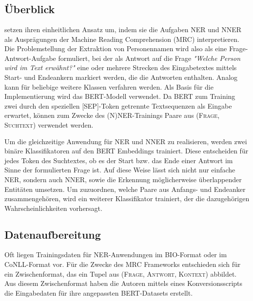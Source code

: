 

\chapter{}
\label{ch:MRC}


\section{Überblick}
\label{ch:MRC:sec:Überblick}

\cite{li2019unified} setzen ihren einheitlichen Ansatz um, indem sie die Aufgaben NER und NNER als Ausprägungen der Machine Reading Comprehension (MRC) interpretieren. Die Problemstellung der Extraktion von Personennamen wird also als eine Frage-Antwort-Aufgabe formuliert, bei der als Antwort auf die Frage \emph{"Welche Person wird im Text erwähnt?"} eine oder mehrere Strecken des Eingabetextes mittels Start- und Endeankern markiert werden, die die Antworten enthalten. Analog kann für beliebige weitere Klassen verfahren werden. Als Basis für die Implementierung wird das BERT-Modell \parencite{devlin2019bert} verwendet. Da BERT zum Training zwei durch den speziellen [SEP]-Token getrennte Textsequenzen als Eingabe erwartet, können zum Zwecke des (N)NER-Trainings Paare aus \textsc{(Frage, Suchtext)} verwendet werden.

Um die gleichzeitige Anwendung für NER und NNER zu realisieren, werden zwei binäre Klassifikatoren auf den BERT Embeddings trainiert. Diese entscheiden für jedes Token des Suchtextes, ob es der Start bzw. das Ende einer Antwort im Sinne der formulierten Frage ist. Auf diese Weise lässt sich nicht nur einfache NER, sondern auch NNER, sowie die Erkennung möglicherweise überlappender Entitäten umsetzen. Um zuzuordnen, welche Paare aus Anfangs- und Endeanker zusammengehören, wird ein weiterer Klassifikator trainiert, der die dazugehörigen Wahrscheinlichkeiten vorhersagt.

\section{Datenaufbereitung}
\label{ch:MRC:sec:Datenaufbereitung}

Oft liegen Trainingsdaten für NER-Anwendungen im BIO-Format oder im CoNLL-Format vor. Für die Zwecke des MRC Frameworks entschieden sich  für ein Zwischenformat, das ein Tupel aus \textsc{(Frage, Antwort, Kontext)} abbildet. Aus diesem Zwischenformat haben die Autoren mittels eines Konversionsscripts die Eingabedaten für ihre angepassten BERT-Datasets erstellt.

